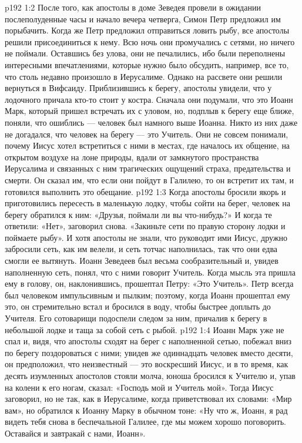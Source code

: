 \vs p192 1:2 После того, как апостолы в доме Зеведея провели в ожидании послеполуденные часы и начало вечера четверга, Симон Петр предложил им порыбачить. Когда же Петр предложил отправиться ловить рыбу, все апостолы решили присоединиться к нему. Всю ночь они промучались с сетями, но ничего не поймали. Оставшись без улова, они не печалились, ибо были переполнены интересными впечатлениями, которые нужно было обсудить, например, все то, что столь недавно произошло в Иерусалиме. Однако на рассвете они решили вернуться в Вифсаиду. Приблизившись к берегу, апостолы увидели, что у лодочного причала кто\hyp{}то стоит у костра. Сначала они подумали, что это Иоанн Марк, который пришел встречать их с уловом, но, подплыв к берегу еще ближе, поняли, что ошиблись --- человек был намного выше Иоанна. Никто из них даже не догадался, что человек на берегу --- это Учитель. Они не совсем понимали, почему Иисус хотел встретиться с ними в местах, где началось их общение, на открытом воздухе на лоне природы, вдали от замкнутого пространства Иерусалима и связанных с ним трагических ощущений страха, предательства и смерти. Он сказал им, что если они пойдут в Галилею, то он встретит их там, и готовился выполнить это обещание.
\vs p192 1:3 Когда апостолы бросили якорь и приготовились пересесть в маленькую лодку, чтобы сойти на берег, человек на берегу обратился к ним: «Друзья, поймали ли вы что\hyp{}нибудь?» И когда те ответили: «Нет», заговорил снова. «Закиньте сети по правую сторону лодки и поймаете рыбу». И хотя апостолы не знали, что руководит ими Иисус, дружно забросили сеть, как им велели, и сеть тотчас наполнилась, так что они едва смогли ее вытянуть. Иоанн Зеведеев был весьма сообразительный и, увидев наполненную сеть, понял, что с ними говорит Учитель. Когда мысль эта пришла ему в голову, он, наклонившись, прошептал Петру: «Это Учитель». Петр всегда был человеком импульсивным и пылким; поэтому, когда Иоанн прошептал ему это, он стремительно встал и бросился в воду, чтобы быстрее доплыть до Учителя. Его сотоварищи подоспели следом за ним, причалив к берегу в небольшой лодке и таща за собой сеть с рыбой.
\vs p192 1:4 Иоанн Марк уже не спал и, видя, что апостолы сходят на берег с наполненной сетью, побежал вниз по берегу поздороваться с ними; увидев же одиннадцать человек вместо десяти, он предположил, что неизвестный --- это воскресший Иисус, и в то время, как десять изумленных апостолов стояли молча, юноша бросился к Учителю и, упав на колени к его ногам, сказал: «Господь мой и Учитель мой». Тогда Иисус заговорил, но не так, как в Иерусалиме, когда приветствовал их словами: «Мир вам», но обратился к Иоанну Марку в обычном тоне: «Ну что ж, Иоанн, я рад видеть тебя снова в беспечальной Галилее, где мы можем хорошо поговорить. Оставайся и завтракай с нами, Иоанн».
